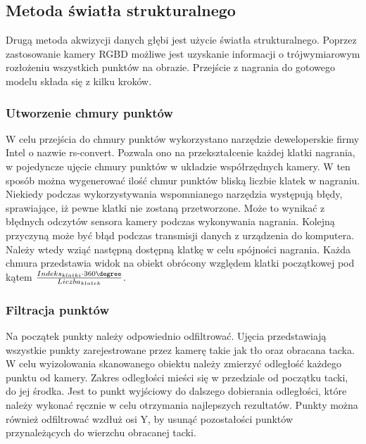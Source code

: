 \subsection{Metoda światła strukturalnego}
Drugą metoda akwizycji danych głębi jest użycie światła strukturalnego. Poprzez zastosowanie kamery RGBD możliwe jest uzyskanie informacji o trójwymiarowym rozłożeniu wszystkich punktów na obrazie. Przejście z nagrania do gotowego modelu składa się z kilku kroków.
\subsubsection{Utworzenie chmury punktów}
W celu przejścia do chmury punktów wykorzystano narzędzie deweloperskie firmy Intel o nazwie rs-convert. Pozwala ono na przekształcenie każdej klatki nagrania, w pojedyncze ujęcie chmury punktów w układzie współrzędnych kamery. W ten sposób można wygenerować ilość chmur punktów bliską liczbie klatek w nagraniu. Niekiedy podczas wykorzystywania wspomnianego narzędzia występują błędy, sprawiające, iż pewne klatki nie zostaną przetworzone. Może to wynikać z błędnych odczytów sensora kamery podczas wykonywania nagrania. Kolejną przyczyną może być błąd podczas transmisji danych z urządzenia do komputera. Należy wtedy wziąć następną dostępną klatkę w celu spójności nagrania. Każda chmura przedstawia widok na obiekt obrócony względem klatki początkowej pod kątem $\frac{Indeks_{klatki}\cdot 360\degree}{Liczba_{klatek}}$. 
\subsubsection{Filtracja punktów}
Na początek punkty należy odpowiednio odfiltrować. Ujęcia przedstawiają wszystkie punkty zarejestrowane przez kamerę takie jak tło oraz obracana tacka. W celu wyizolowania skanowanego obiektu należy zmierzyć odległość każdego punktu od kamery. Zakres odległości mieści się w przedziale od początku tacki, do jej środka. Jest to punkt wyjściowy do dalszego dobierania odległości, które należy wykonać ręcznie w celu otrzymania najlepszych rezultatów. Punkty można również odfiltrować wzdłuż osi Y, by usunąć pozostałości punktów przynależących do wierzchu obracanej tacki.
